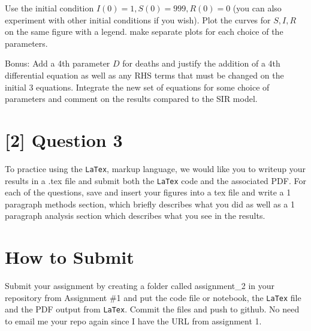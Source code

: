 \documentclass{article}
\begin{document}
Use the initial condition $I(0) = 1, S(0)=999, R(0) = 0$ (you can also experiment with other initial conditions if you wish).
Plot the curves for $S, I, R$ on the same figure with a legend. make separate plots for each choice of the parameters.

Bonus: Add a 4th parameter $D$ for deaths and justify the addition of a 4th differential equation as well as any RHS terms that must be changed on the initial 3 equations. Integrate the new set of equations for some choice of parameters and comment on the results compared to the SIR model.

\section*{[2] Question 3}

To practice using the \texttt{LaTex}, markup language, we would like you to writeup your results in a .tex file and submit both the \texttt{LaTex} code and the associated PDF. For each of the questions, save and insert your figures into a tex file and write a 1 paragraph methods section, which briefly describes what you did as well as a 1 paragraph analysis section which describes what you see in the results.

\section*{How to Submit}

Submit your assignment by creating a folder called assignment\_2 in your repository from Assignment \#1 and put the code file or notebook, the \texttt{LaTex} file and the PDF output from \texttt{LaTex}. Commit the files and push to github. No need to email me your repo again since I have the URL from assignment 1.
\end{document}
